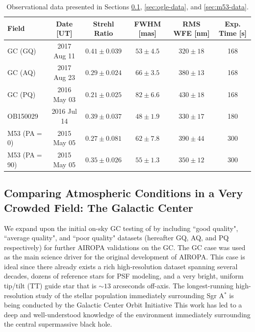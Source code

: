 \documentclass[]{spie}  %
\begin{document}
\begin{table}[!h]
\centering
\caption{Observational data presented in Sections \ref{sec:gc-data}, \ref{sec:ogle-data}, and \ref{sec:m53-data}.} \label{tab:fields-metrics}
\begin{tabular}{|l|c|c|c|c|c|}
\hline
        Field &  Date [UT] &  Strehl Ratio &  FWHM [mas] &  RMS WFE [nm] & Exp. Time [s] \\\hline\hline
        GC (GQ) &   2017 Aug 11 & $0.41 \pm 0.039$ & $53 \pm 4.5$ & $320 \pm 18$ & 168\\
        GC (AQ) &   2017 Aug 23 & $0.29 \pm 0.024$ & $66 \pm 3.5$ & $380 \pm 13$ & 168\\
        GC (PQ) &   2016 May 03 & $0.21 \pm 0.025$ & $82 \pm 6.6$ & $430 \pm 18$ & 168\\
        OB150029 &    2016 Jul 14 &  $0.39 \pm 0.037$ & $48 \pm 1.9$ & $330 \pm 17$ & 180\\
        M53 (PA$=$0) &   2015 May 05 &  $0.27 \pm 0.081$ & $62 \pm 7.8$ & $390 \pm 44$ & 300\\
        M53 (PA$=$90) &   2015 May 05 & $0.35 \pm 0.026$ & $55 \pm 1.3$ & $350 \pm 12$ & 300\\\hline
\end{tabular}
\end{table}

\subsection{Comparing Atmospheric Conditions in a Very Crowded Field: The Galactic Center} \label{sec:gc-data}
We expand upon the initial on-sky GC testing of \cite{Turri:inprep} by including ``good quality", ``average quality", and ``poor quality" datasets (hereafter GQ, AQ, and PQ respectively) for further AIROPA validations on the GC. The GC case was used as the main science driver for the original development of AIROPA. This case is ideal since there already exists a rich high-resolution dataset spanning several decades, dozens of reference stars for PSF modeling, and a very bright, uniform tip/tilt (TT) guide star that is ${\sim}13$ arcseconds off-axis. The longest-running high-resolution study of the stellar population immediately surrounding Sgr A$^{*}$ is being conducted by the Galactic Center Orbit Initiative
This work has led to a deep and well-understood knowledge \citep{ghez:2005b, ghez:2008a, lu:2008a, do:2019a, gautam:2019a} of the environment immediately surrounding the central supermassive black hole.
\end{document}
